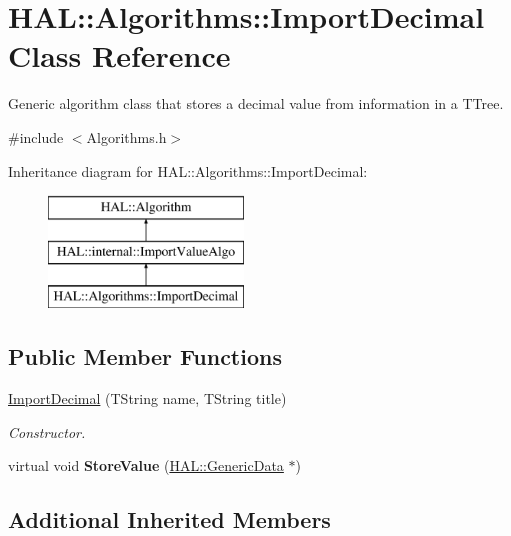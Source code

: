 \hypertarget{class_h_a_l_1_1_algorithms_1_1_import_decimal}{\section{H\-A\-L\-:\-:Algorithms\-:\-:Import\-Decimal Class Reference}
\label{class_h_a_l_1_1_algorithms_1_1_import_decimal}
}


Generic algorithm class that stores a decimal value from information in a T\-Tree.  




{\ttfamily \#include $<$Algorithms.\-h$>$}

Inheritance diagram for H\-A\-L\-:\-:Algorithms\-:\-:Import\-Decimal\-:\begin{figure}[H]
\begin{center}
\leavevmode
\includegraphics[height=3.000000cm]{class_h_a_l_1_1_algorithms_1_1_import_decimal}
\end{center}
\end{figure}
\subsection*{Public Member Functions}
\begin{DoxyCompactItemize}
\item 
\hyperlink{class_h_a_l_1_1_algorithms_1_1_import_decimal_a15781bef55e9a3ff8de1ec1f64a94ff5}{Import\-Decimal} (T\-String name, T\-String title)
\begin{DoxyCompactList}\small\item\em Constructor. \end{DoxyCompactList}\item 
\hypertarget{class_h_a_l_1_1_algorithms_1_1_import_decimal_a3044dabc75bee09871d80f32333e730f}{virtual void {\bfseries Store\-Value} (\hyperlink{class_h_a_l_1_1_generic_data}{H\-A\-L\-::\-Generic\-Data} $\ast$)}\label{class_h_a_l_1_1_algorithms_1_1_import_decimal_a3044dabc75bee09871d80f32333e730f}

\end{DoxyCompactItemize}
\subsection*{Additional Inherited Members}


